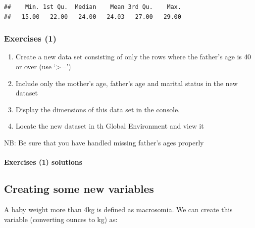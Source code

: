 \documentclass[
]{book}
\newenvironment{Shaded}{\begin{snugshade}}{\end{snugshade}}
\newcommand{\FloatTok}[1]{\textcolor[rgb]{0.00,0.00,0.81}{#1}}
\newcommand{\FunctionTok}[1]{\textcolor[rgb]{0.00,0.00,0.00}{#1}}
\newcommand{\NormalTok}[1]{#1}
\newcommand{\OtherTok}[1]{\textcolor[rgb]{0.56,0.35,0.01}{#1}}
\newcommand{\SpecialCharTok}[1]{\textcolor[rgb]{0.00,0.00,0.00}{#1}}
\begin{document}
\begin{Shaded}
\end{Shaded}

\begin{verbatim}
##    Min. 1st Qu.  Median    Mean 3rd Qu.    Max. 
##   15.00   22.00   24.00   24.03   27.00   29.00
\end{verbatim}

\hypertarget{exercises-1}{%
\subsubsection*{Exercises (1)}\label{exercises-1}}

\begin{enumerate}
\def\labelenumi{\arabic{enumi}.}
\item
  Create a new data set consisting of only the rows where the father's age is 40 or over (use `\textgreater=')
\item
  Include only the mother's age, father's age and marital status in the new dataset
\item
  Display the dimensions of this data set in the console.
\item
  Locate the new dataset in th Global Environment and view it
\end{enumerate}

NB: Be sure that you have handled missing father's ages properly

\hypertarget{exercises-1-solutions}{%
\paragraph*{Exercises (1) solutions}\label{exercises-1-solutions}}

\hypertarget{creating-some-new-variables}{%
\subsection*{Creating some new variables}\label{creating-some-new-variables}}

A baby weight more than 4kg is defined as macrosomia. We can create this variable (converting ounces to kg) as:
\end{document}
